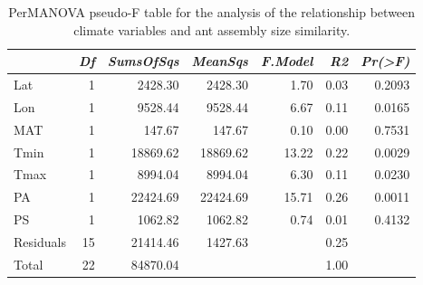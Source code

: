 \begin{table}[ht]
\centering
\begin{tabular}{lrrrrrr}
  \hline
 & {\emph{Df}} & {\emph{SumsOfSqs}} & {\emph{MeanSqs}} & {\emph{F.Model}} & {\emph{R2}} & {\emph{Pr(>F)}} \\ 
  \hline
Lat & 1 & 2428.30 & 2428.30 & 1.70 & 0.03 & 0.2093 \\ 
  Lon & 1 & 9528.44 & 9528.44 & 6.67 & 0.11 & 0.0165 \\ 
  MAT & 1 & 147.67 & 147.67 & 0.10 & 0.00 & 0.7531 \\ 
  Tmin & 1 & 18869.62 & 18869.62 & 13.22 & 0.22 & 0.0029 \\ 
  Tmax & 1 & 8994.04 & 8994.04 & 6.30 & 0.11 & 0.0230 \\ 
  PA & 1 & 22424.69 & 22424.69 & 15.71 & 0.26 & 0.0011 \\ 
  PS & 1 & 1062.82 & 1062.82 & 0.74 & 0.01 & 0.4132 \\ 
  Residuals & 15 & 21414.46 & 1427.63 &  & 0.25 &  \\ 
  Total & 22 & 84870.04 &  &  & 1.00 &  \\ 
   \hline
\end{tabular}
\caption{PerMANOVA pseudo-F table for the analysis of the relationship between climate variables and ant assembly size similarity.} 
\label{tab:perm_size}
\end{table}
